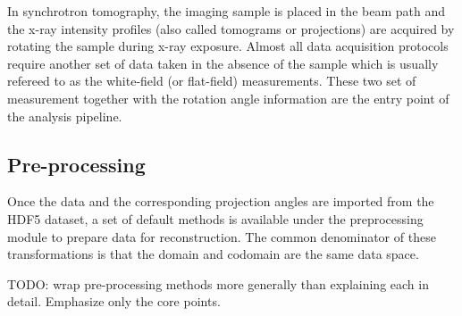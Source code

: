 \documentclass[pdf]{iucr}              %
\begin{document}
In synchrotron tomography, the imaging sample is placed in the beam path and the x-ray intensity profiles (also called tomograms or projections) are acquired by rotating the sample during x-ray exposure. Almost all data acquisition protocols require another set of data taken in the absence of the sample which is usually refereed to as the white-field (or flat-field) measurements. These two set of measurement together with the rotation angle information are the entry point of the analysis pipeline.

\subsection{Pre-processing}

Once the data and the corresponding projection angles are imported from the HDF5 dataset, a set of default methods is available under the preprocessing module to prepare data for reconstruction. The common denominator of these transformations is that the domain and codomain are the same data space. 

TODO: wrap pre-processing methods more generally than explaining each in detail. Emphasize only the core points.

%
%
%
%
%
%
%
%
%
\end{document}
